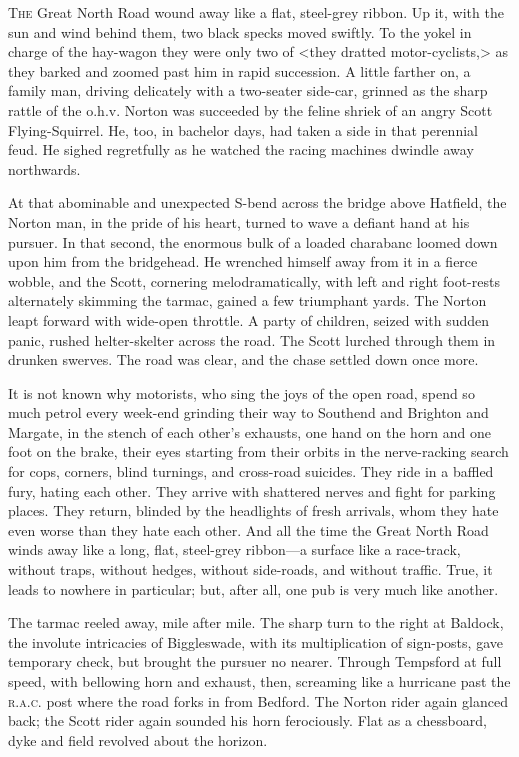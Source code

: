 	
	
\lettrine[lines=4]{T}{he} Great North Road wound away like a flat, steel-grey ribbon. Up it, with the sun and wind behind them, two black specks moved swiftly. To the yokel in charge of the hay-wagon they were only two of <they dratted motor-cyclists,> as they barked and zoomed past him in rapid succession. A little farther on, a family man, driving delicately with a two-seater side-car, grinned as the sharp rattle of the o.h.v. Norton was succeeded by the feline shriek of an angry Scott Flying-Squirrel. He, too, in bachelor days, had taken a side in that perennial feud. He sighed regretfully as he watched the racing machines dwindle away northwards.

At that abominable and unexpected S-bend across the bridge above Hatfield, the Norton man, in the pride of his heart, turned to wave a defiant hand at his pursuer. In that second, the enormous bulk of a loaded charabanc loomed down upon him from the bridgehead. He wrenched himself away from it in a fierce wobble, and the Scott, cornering melodramatically, with left and right foot-rests alternately skimming the tarmac, gained a few triumphant yards. The Norton leapt forward with wide-open throttle. A party of children, seized with sudden panic, rushed helter-skelter across the road. The Scott lurched through them in drunken swerves. The road was clear, and the chase settled down once more.

It is not known why motorists, who sing the joys of the open road, spend so much petrol every week-end grinding their way to Southend and Brighton and Margate, in the stench of each other's exhausts, one hand on the horn and one foot on the brake, their eyes starting from their orbits in the nerve-racking search for cops, corners, blind turnings, and cross-road suicides. They ride in a baffled fury, hating each other. They arrive with shattered nerves and fight for parking places. They return, blinded by the headlights of fresh arrivals, whom they hate even worse than they hate each other. And all the time the Great North Road winds away like a long, flat, steel-grey ribbon—a surface like a race-track, without traps, without hedges, without side-roads, and without traffic. True, it leads to nowhere in particular; but, after all, one pub is very much like another.

The tarmac reeled away, mile after mile. The sharp turn to the right at Baldock, the involute intricacies of Biggleswade, with its multiplication of sign-posts, gave temporary check, but brought the pursuer no nearer. Through Tempsford at full speed, with bellowing horn and exhaust, then, screaming like a hurricane past the \textsc{r.a.c.} post where the road forks in from Bedford. The Norton rider again glanced back; the Scott rider again sounded his horn ferociously. Flat as a chessboard, dyke and field revolved about the horizon.

